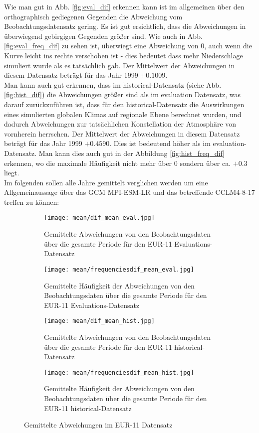 \vfill
Wie man gut in Abb. \ref{fig:eval_dif} erkennen kann ist im allgemeinen über den orthographisch gediegenen Gegenden die Abweichung vom Beobachtungsdatensatz gering. Es ist gut ersichtlich, dass die Abweichungen in überwiegend gebirgigen Gegenden größer sind. Wie auch in Abb. \ref{fig:eval_freq_dif} zu sehen ist, überwiegt eine Abweichung von 0, auch wenn die Kurve leicht ins rechte verschoben ist - dies bedeutet dass mehr Niederschlage simuliert wurde als es tatsächlich gab. Der Mittelwert der Abweichungen in diesem Datensatz beträgt für das Jahr 1999 $+0.1009$.\\
Man kann auch gut erkennen, dass im historical-Datensatz (siehe Abb. \ref{fig:hist_dif}) die Abweichungen größer sind als im evaluation Datensatz, was darauf zurückzuführen ist, dass für den historical-Datensatz die Auswirkungen eines simulierten globalen Klimas auf regionale Ebene berechnet wurden, und dadurch Abweichungen zur tatsächlichen Konstellation der Atmosphäre von vornherein herrschen. Der Mittelwert der Abweichungen in diesem Datensatz beträgt für das Jahr 1999 $+0.4590$. Dies ist bedeutend höher als im evaluation-Datensatz. Man kann dies auch gut in der Abbildung \ref{fig:hist_freq_dif} erkennen, wo die maximale Häufigkeit nicht mehr über $0$ sondern über ca. $+0.3$ liegt.\\
Im folgenden sollen alle Jahre gemittelt verglichen werden um eine Allgemeinaussage über das GCM MPI-ESM-LR und das betreffende CCLM4-8-17 treffen zu können:
\begin{figure}[h]
	\begin{subfigure}[h]{0.49\textwidth}
	\centering
	\texttt{[image: mean/dif\_mean\_eval.jpg]}
	\caption{Gemittelte Abweichungen von den Beobachtungsdaten über die gesamte Periode für den EUR-11 Evaluations-Datensatz}
	\label{fig:mean_dif_eval}
	\end{subfigure}
	\begin{subfigure}[h]{0.49\textwidth}
		\centering
		\texttt{[image: mean/frequenciesdif\_mean\_eval.jpg]}
		\caption{Gemittelte Häufigkeit der Abweichungen von den Beobachtungsdaten über die gesamte Periode für den EUR-11 Evaluations-Datensatz}
		\label{fig:freq_mean_dif_eval}
	\end{subfigure}
	\begin{subfigure}[h]{0.49\textwidth}
	\centering
	\texttt{[image: mean/dif\_mean\_hist.jpg]}
	\caption{Gemittelte Abweichungen von den Beobachtungsdaten über die gesamte Periode für den EUR-11 historical-Datensatz}
	\label{fig:mean_dif_hist}
	\end{subfigure}
	\begin{subfigure}[h]{0.49\textwidth}
			\centering
		\texttt{[image: mean/frequenciesdif\_mean\_hist.jpg]}
		\caption{Gemittelte Häufigkeit der Abweichungen von den Beobachtungsdaten über die gesamte Periode für den EUR-11  historical-Datensatz}
		\label{fig:freq_mean_dif_hist}
	\end{subfigure}
	\caption{Gemittelte Abweichungen im EUR-11 Datensatz}
\end{figure}
